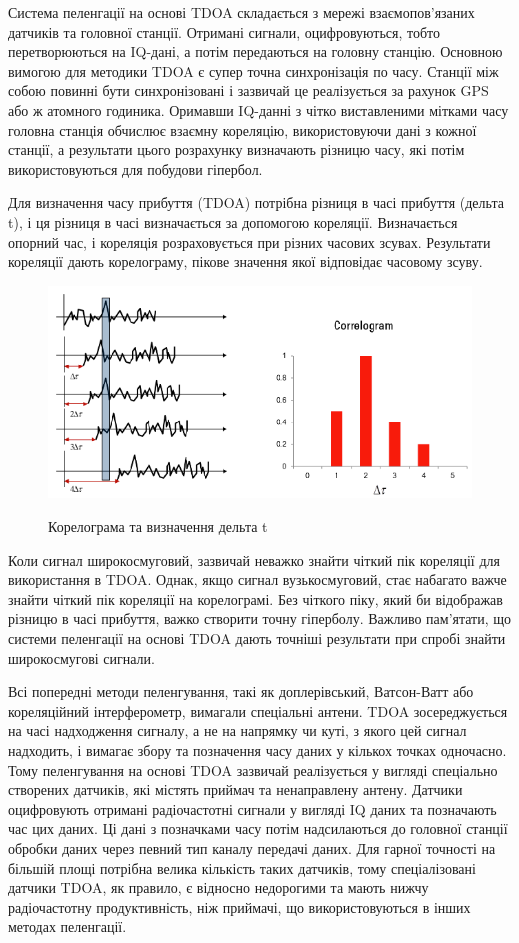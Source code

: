 \documentclass{article}
\begin{document}
Система пеленгації на основі TDOA складається з мережі взаємопов'язаних датчиків та головної станції. Отримані сигнали, оцифровуються, тобто перетворюються на IQ-дані, а потім передаються на головну станцію. Основною вимогою для методики TDOA є супер точна синхронізація по часу. Станції між собою повинні бути синхронізовані і зазвичай це реалізується за рахунок GPS або ж атомного годиника. Оримавши IQ-данні з чітко виставленими мітками часу головна станція обчислює взаємну кореляцію, використовуючи дані з кожної станції, а результати цього розрахунку визначають різницю часу, які потім використовуються для побудови гіпербол.

Для визначення часу прибуття (TDOA) потрібна різниця в часі прибуття (дельта t), і ця різниця в часі визначається за допомогою кореляції. Визначається опорний час, і кореляція розраховується при різних часових зсувах. Результати кореляції дають корелограму, пікове значення якої відповідає часовому зсуву.


\begin{figure}[H]
	\centering
	{\includegraphics[width=0.6\linewidth]{images/tdoa_corelelogram.png}}
	\caption{Корелограма та визначення дельта t}
\end{figure}

Коли сигнал широкосмуговий, зазвичай неважко знайти чіткий пік кореляції для використання в TDOA. Однак, якщо сигнал вузькосмуговий, стає набагато важче знайти чіткий пік кореляції на корелограмі. Без чіткого піку, який би відображав різницю в часі прибуття, важко створити точну гіперболу. Важливо пам'ятати, що системи пеленгації на основі TDOA дають точніші результати при спробі знайти широкосмугові сигнали.

Всі попередні методи пеленгування, такі як доплерівський, Ватсон-Ватт або кореляційний інтерферометр, вимагали спеціальні антени. TDOA зосереджується на часі надходження сигналу, а не на напрямку чи куті, з якого цей сигнал надходить, і вимагає збору та позначення часу даних у кількох точках одночасно. Тому пеленгування на основі TDOA зазвичай реалізується у вигляді спеціально створених датчиків, які містять приймач та ненаправлену антену. Датчики оцифровують отримані радіочастотні сигнали у вигляді IQ даних та позначають час цих даних. Ці дані з позначками часу потім надсилаються до головної станції обробки даних через певний тип каналу передачі даних. Для гарної точності на більшій площі потрібна велика кількість таких датчиків, тому спеціалізовані датчики TDOA, як правило, є відносно недорогими та мають нижчу радіочастотну продуктивність, ніж приймачі, що використовуються в інших методах пеленгації.
\end{document}
